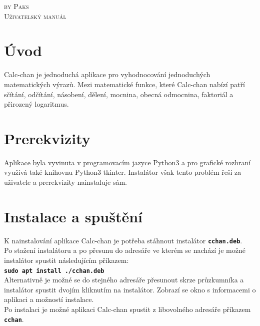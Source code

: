 \documentclass[a4paper, 11pt]{article}
\begin{document}
\begin{titlepage}
\vspace*{\fill}
 {\Large \textsc{by Paks}}\\[0.3em]
{\fontsize{40}{40}\textsc{Uživatelský manuál}}
\vspace*{\fill}
\end{titlepage}
	
\tableofcontents

\newpage

\section{Úvod}
Calc-chan je jednoduchá aplikace pro vyhodnocování jednoduchých matematických výrazů. Mezi matematické funkce, které Calc-chan nabízí patří sčítání, odčítání, násobení, dělení, mocnina, obecná odmocnina, faktoriál a přirozený logaritmus.

\section{Prerekvizity}
Aplikace byla vyvinuta v programovacím jazyce Python3 a pro grafické rozhraní využívá také knihovnu Python3 tkinter. Instalátor však tento problém řeší za uživatele a prerekvizity nainstaluje sám.

\section{Instalace a spuštění}
K nainstalování aplikace Calc-chan je potřeba stáhnout instalátor \texttt{\textbf{cchan.deb}}. \\

\noindent Po stažení instalátoru a po přesunu do adresáře ve kterém se nachází je možné instalátor spustit následujícím příkazem:\\
\texttt{\textbf{sudo apt install ./cchan.deb}}\\

\noindent Alternativně je možné se do stejného adresáře přesunout skrze průzkumníka a instalátor spustit dvojím kliknutím na instalátor. Zobrazí se okno s informacemi o aplikaci a možností instalace.\\

\noindent Po instalaci je možné aplikaci Calc-chan spustit z libovolného adresáře příkazem \texttt{\textbf{cchan}}.
\end{document}
